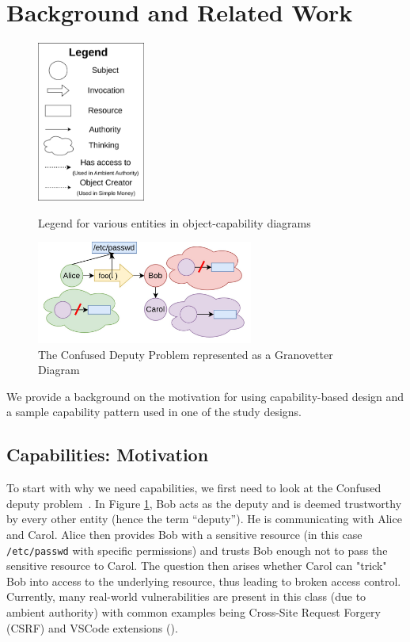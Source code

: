 \section{Background and Related Work}\label{sec-background}


\begin{figure}[htbp]
\begin{minipage}[t]{0.35\textwidth}
\centering
\includegraphics[width=1.4in]{figures/Legend.jpg}
\caption{Legend for various entities in object-capability diagrams}
\end{minipage}
\hspace{\fill}
\begin{minipage}[t]{0.55\textwidth}
\centering
\includegraphics[width=2.8in]{figures/confused_deputy.jpg}
\caption{The Confused Deputy Problem represented as a Granovetter Diagram \cite{millerCapRights}}
\label{cdp}
\end{minipage}
\end{figure}
\noindent
We provide a background on the motivation for using capability-based design and a sample capability pattern used in one of the study designs. 

\subsection{Capabilities: Motivation}

\noindent
To start with why we need capabilities, we first need to look at the Confused deputy problem~\cite{millerCapRights}. In Figure \ref{cdp}, Bob acts as the deputy and is deemed trustworthy by every other entity (hence the term ``deputy''). He is communicating with Alice and Carol. Alice then provides Bob with a sensitive resource (in this case \texttt{/etc/passwd} with specific permissions) and trusts Bob enough not to pass the sensitive resource to Carol. The question then arises whether Carol can "trick" Bob into access to the underlying resource, thus leading to broken access control. Currently, many real-world vulnerabilities are present in this class (due to ambient authority) with common examples being Cross-Site Request Forgery (CSRF) \cite{blatz2007csrf} and VSCode extensions (\cite{vscodevuln}).


